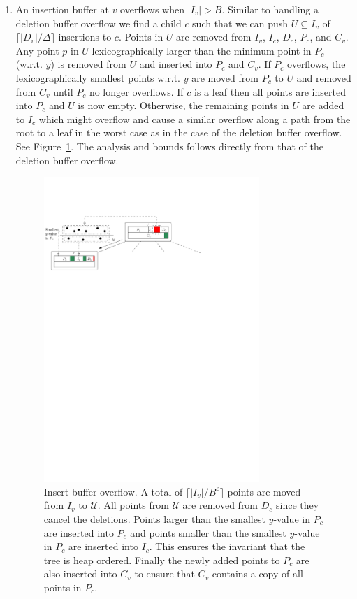 \documentclass[twoside,11pt,openright]{report}
\def \epsilon {\varepsilon}
\begin{document}
\begin{enumerate}[label=(\roman*)]
	\item\label{update:ins} An insertion buffer at $v$ overflows when $\vert I_v \vert > B$. Similar to handling a deletion buffer overflow we find a child $c$ such that we can push $U \subseteq I_v$ of $\lceil \vert D_v \vert / \Delta \rceil$ insertions to $c$. Points in $U$ are removed from $I_v$, $I_c$, $D_c$, $P_c$, and $C_v$.
	Any point $p$ in $U$ lexicographically larger than the minimum point in $P_c$ (w.r.t. $y$) is removed from $U$ and inserted into $P_c$ and $C_v$.
	If $P_c$ overflows, the lexicographically smallest points w.r.t. $y$ are moved from $P_c$ to $U$ and removed from $C_v$ until $P_c$ no longer overflows.
	If $c$ is a leaf then all points are inserted into $P_c$ and $U$ is now empty.
	Otherwise, the remaining points in $U$ are added to $I_c$ which might overflow and cause a similar overflow along a path from the root to a leaf in the worst case as in the case of the deletion buffer overflow. See Figure~\ref{fig:brodal_insert_buffer_overflow}. The analysis and bounds follows directly from that of the deletion buffer overflow.
	
	\begin{figure}[b]
		\centering
		\includegraphics[width=0.77\textwidth]{../figures/brodal_insert_buffer_overflow}
		\caption{Insert buffer overflow. A total of $\lceil \lvert I_v \rvert /B^\epsilon \rceil$ points are moved from $I_v$ to $\mathcal{U}$. All points from $\mathcal{U}$ are removed from $D_c$ since they cancel the deletions. Points larger than the smallest $y$-value in $P_c$ are inserted into $P_c$ and points smaller than the smallest $y$-value in $P_c$ are inserted into $I_c$. This ensures the invariant that the tree is heap ordered. Finally the newly added points to $P_c$ are also inserted into $C_v$ to ensure that $C_v$ contains a copy of all points in $P_c$.}
		\label{fig:brodal_insert_buffer_overflow}
	\end{figure}		
	

\end{enumerate}
\end{document}

